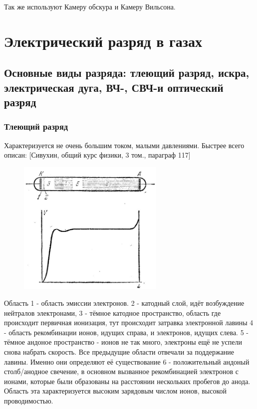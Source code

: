 \documentclass[10pt, a4paper]{article}
\let\stdsection\section
\renewcommand\section{\newpage\stdsection}
\begin{document}
Так же используют Камеру обскура и Камеру Вильсона.

\section{Электрический разряд в газах}

\subsection{Основные виды разряда: тлеющий разряд, искра, электрическая дуга, ВЧ-, СВЧ-и оптический разряд}
\subsubsection{Тлеющий разряд}
Характеризуется не очень большим током, малыми давлениями.
Быстрее всего описан: [Сивухин, общий курс физики, 3 том., параграф 117]

\begin{figure}[h!]
	\begin{center}
		\includegraphics[width=70mm]{12.1.JPG}
	\end{center}
\end{figure}

Область 1 - область эмиссии электронов. 2 - катодный слой, идёт возбуждение нейтралов электронами, 3 - тёмное катодное пространство, область где происходит первичная ионизация, тут происходит затравка электронной лавины 4 - область рекомбинации ионов, идущих справа, и электронов, идущих слева. 5 - тёмное андоное пространство - ионов не так много, электроны ещё не успели снова набрать скорость. Все предыдущие области отвечали за поддержание лавины. Именно они определяют её существование  6 - положительный андоный столб/анодное свечение, в основном вызванное рекомбинацией электронов с ионами, которые были образованы на расстоянии нескольких пробегов до анода. Область эта характеризуется высоким зарядовым числом ионов, высокой проводимостью.
\end{document}
